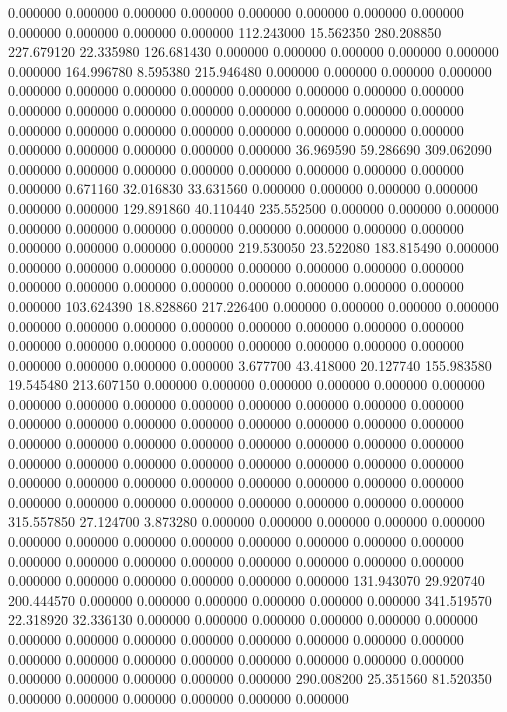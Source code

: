 0.000000 0.000000 0.000000
0.000000 0.000000 0.000000
0.000000 0.000000 0.000000
0.000000 0.000000 0.000000
112.243000 15.562350 280.208850
227.679120 22.335980 126.681430
0.000000 0.000000 0.000000
0.000000 0.000000 0.000000
164.996780 8.595380 215.946480
0.000000 0.000000 0.000000
0.000000 0.000000 0.000000
0.000000 0.000000 0.000000
0.000000 0.000000 0.000000
0.000000 0.000000 0.000000
0.000000 0.000000 0.000000
0.000000 0.000000 0.000000
0.000000 0.000000 0.000000
0.000000 0.000000 0.000000
0.000000 0.000000 0.000000
0.000000 0.000000 0.000000
36.969590 59.286690 309.062090
0.000000 0.000000 0.000000
0.000000 0.000000 0.000000
0.000000 0.000000 0.000000
0.671160 32.016830 33.631560
0.000000 0.000000 0.000000
0.000000 0.000000 0.000000
129.891860 40.110440 235.552500
0.000000 0.000000 0.000000
0.000000 0.000000 0.000000
0.000000 0.000000 0.000000
0.000000 0.000000 0.000000
0.000000 0.000000 0.000000
219.530050 23.522080 183.815490
0.000000 0.000000 0.000000
0.000000 0.000000 0.000000
0.000000 0.000000 0.000000
0.000000 0.000000 0.000000
0.000000 0.000000 0.000000
0.000000 0.000000 0.000000
103.624390 18.828860 217.226400
0.000000 0.000000 0.000000
0.000000 0.000000 0.000000
0.000000 0.000000 0.000000
0.000000 0.000000 0.000000
0.000000 0.000000 0.000000
0.000000 0.000000 0.000000
0.000000 0.000000 0.000000
0.000000 0.000000 0.000000
3.677700 43.418000 20.127740
155.983580 19.545480 213.607150
0.000000 0.000000 0.000000
0.000000 0.000000 0.000000
0.000000 0.000000 0.000000
0.000000 0.000000 0.000000
0.000000 0.000000 0.000000
0.000000 0.000000 0.000000
0.000000 0.000000 0.000000
0.000000 0.000000 0.000000
0.000000 0.000000 0.000000
0.000000 0.000000 0.000000
0.000000 0.000000 0.000000
0.000000 0.000000 0.000000
0.000000 0.000000 0.000000
0.000000 0.000000 0.000000
0.000000 0.000000 0.000000
0.000000 0.000000 0.000000
0.000000 0.000000 0.000000
0.000000 0.000000 0.000000
315.557850 27.124700 3.873280
0.000000 0.000000 0.000000
0.000000 0.000000 0.000000
0.000000 0.000000 0.000000
0.000000 0.000000 0.000000
0.000000 0.000000 0.000000
0.000000 0.000000 0.000000
0.000000 0.000000 0.000000
0.000000 0.000000 0.000000
0.000000 0.000000 0.000000
131.943070 29.920740 200.444570
0.000000 0.000000 0.000000
0.000000 0.000000 0.000000
341.519570 22.318920 32.336130
0.000000 0.000000 0.000000
0.000000 0.000000 0.000000
0.000000 0.000000 0.000000
0.000000 0.000000 0.000000
0.000000 0.000000 0.000000
0.000000 0.000000 0.000000
0.000000 0.000000 0.000000
0.000000 0.000000 0.000000
0.000000 0.000000 0.000000
290.008200 25.351560 81.520350
0.000000 0.000000 0.000000
0.000000 0.000000 0.000000
